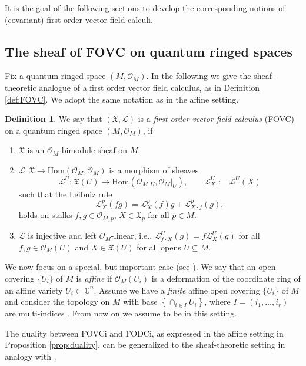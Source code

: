 \documentclass{article}
\theoremstyle{definition}
\newtheorem{definition}[thm]{Definition}
\newcommand{\cO}{{\mathcal{O}}}
\newcommand{\C}{{\mathbb{C}}}
\newcommand{\lra}{{\longrightarrow}}
\newcommand{\Chi}{{\mathfrak{X}}}
\begin{document}
It is the goal of the following sections to develop the corresponding notions of (covariant) first order vector field calculi.


\subsection{The sheaf of FOVC on quantum ringed spaces}\label{sec:sheafFOVC}

Fix a quantum ringed space $(M,\mathcal{O}_M)$. In the following we give the sheaf-theoretic analogue of a first order vector field calculus, as in Definition \ref{def:FOVC}. We adopt the same notation as in the affine setting.

\begin{definition}\label{sheaf-vf}
	We say that $(\Chi,\mathscr{L})$ is a 
	\textit{first order vector field calculus} (FOVC)
	on  a quantum ringed space $(M,\cO_M)$,
	if
	\begin{enumerate}
		\item[i.)] $\Chi$ is an $\cO_M$-bimodule sheaf on $M$.
		\item[ii.)] $\mathscr{L}:\Chi \lra \mathrm{Hom}(\cO_M,\cO_M)$
		is a morphism of sheaves 
		$$
		\mathscr{L}^U:\Chi(U) \lra \mathrm{Hom}(\cO_M|_U,\cO_M|_U), \qquad
		\mathscr{L}^U_X:=\mathscr{L}^U(X)
		$$
		such that the Leibniz rule
		\begin{equation}
			\mathscr{L}^p_X(fg)=\mathscr{L}^p_X(f)g+\mathscr{L}^p_{X\cdot f}(g),
		\end{equation}
		holds on stalks $f,g\in \cO_{M,p}$, $X \in \Chi_p$ for all $p\in M$.
		\item[iii.)] $\mathscr{L}$ is injective and left $\mathcal{O}_M$-linear, i.e., $\mathscr{L}^U_{f\cdot X}(g)=f\mathscr{L}^U_X(g)$ for all $f,g\in\mathcal{O}_M(U)$ and $X\in\mathfrak{X}(U)$ for all opens $U\subseteq M$.
	\end{enumerate}
\end{definition}
We now focus on a special, but important case (see \cite{afl, aflw}).
We say that an open covering $\{U_i\}$ of $M$ is \textit{affine} if $\cO_M(U_i)$
is a deformation of the coordinate ring of an affine variety $U_i \subset \C^n$.
Assume we have a {\sl finite} affine
open covering $\{U_i\}$ of $M$ and consider the topology on $M$
with base $\left\{\cap_{i \in I} U_i\right\}$, where 
$I=(i_1, \dots, i_r)$ are multi-indices \cite{aflw}.
From now on we assume to be in this setting.

The duality between FOVCi and FODCi, as expressed in the affine setting
in Proposition \ref{prop:duality}, can be generalized to the sheaf-theoretic setting
in analogy with \cite[3, Section 16, Proposition 16.5.3]{egaIV}.
\end{document}
